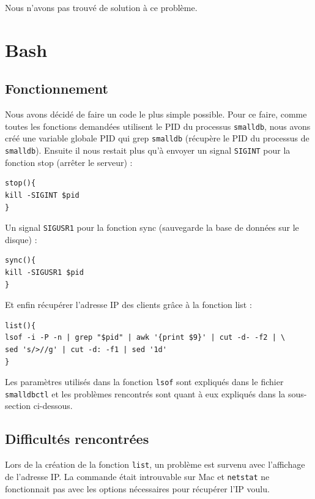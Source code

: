 \documentclass[utf8]{article}
\begin{document}
Nous n'avons pas trouvé de solution à ce problème.


\section{Bash}

\subsection{Fonctionnement}

Nous avons décidé de faire un code le plus simple possible. Pour ce faire, comme toutes les fonctions demandées utilisent le PID du processus \texttt{smalldb}, nous avons créé une variable globale PID qui grep \texttt{smalldb} (récupère le PID du processus de \texttt{smalldb}). Ensuite il nous restait plus qu'à envoyer un signal \texttt{SIGINT} pour la fonction stop (arrêter le serveur) :

\begin{lstlisting}
stop(){
kill -SIGINT $pid
}
\end{lstlisting}

Un signal \texttt{SIGUSR1} pour la fonction sync (sauvegarde la base de données sur le disque) :

\begin{lstlisting}
sync(){
kill -SIGUSR1 $pid
}
\end{lstlisting}

Et enfin récupérer l'adresse IP des clients grâce à la fonction list : 

\begin{lstlisting}
list(){
lsof -i -P -n | grep "$pid" | awk '{print $9}' | cut -d- -f2 | \
sed 's/>//g' | cut -d: -f1 | sed '1d'
}
\end{lstlisting}

Les paramètres utilisés dans la fonction \texttt{lsof} sont expliqués dans le fichier \texttt{smalldbctl} et les problèmes rencontrés sont quant à eux expliqués dans la sous-section ci-dessous.

\subsection{Difficultés rencontrées}

Lors de la création de la fonction \texttt{list}, un problème est survenu avec l'affichage de l'adresse IP. La commande  était introuvable sur Mac et \texttt{netstat} ne fonctionnait pas avec les options nécessaires pour récupérer l'IP voulu.
\end{document}

